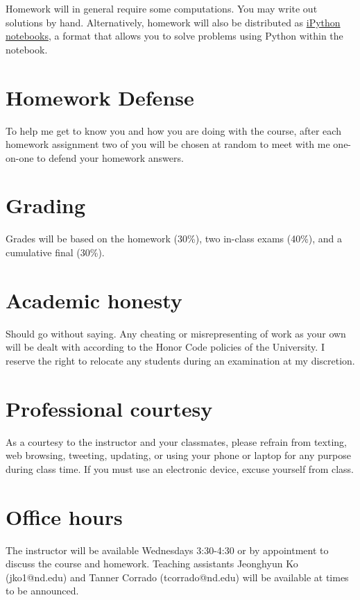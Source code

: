 \documentclass[11pt]{article}
\begin{document}
Homework will in general require some computations. You may write out solutions by hand. Alternatively, homework will also be distributed as \href{https://ipython.org/notebook.html}{iPython notebooks}, a format that allows you to solve problems using Python within the notebook.
\section{Homework Defense}
\label{sec:org4d8bc27}
To help me get to know you and how you are doing with the course, after each homework assignment two of you will be chosen at random to meet with me one-on-one to defend your homework answers.

\section{Grading}
\label{sec:orgc228691}
Grades will be based on the homework (30\%), two in-class exams (40\%), and a cumulative final (30\%).

\section{Academic honesty}
\label{sec:orgd0e04de}
Should go without saying. Any cheating or misrepresenting of work as your own will be dealt with according to the Honor Code policies of the University. I reserve the right to relocate any students during an examination at my discretion.

\section{Professional courtesy}
\label{sec:orgdcec833}
As a courtesy to the instructor and your classmates, please refrain from
texting, web browsing, tweeting, updating, or using your phone or laptop for any
purpose during class time.  If you must use an electronic device, excuse
yourself from class.

\section{Office hours}
\label{sec:org5ceadc5}
The instructor will be available Wednesdays 3:30-4:30 or by appointment to discuss the course and homework.  Teaching assistants Jeonghyun Ko (jko1@nd.edu) and Tanner Corrado (tcorrado@nd.edu) will be available at times to be announced.
\end{document}
